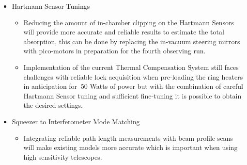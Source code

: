\begin{itemize}
\begin{itemize}
	\end{itemize}
	\item Hartmann Sensor Tunings
	\begin{itemize}
		\item Reducing the amount of in-chamber clipping on the Hartmann Sensors will provide more accurate and reliable results to estimate the total absorption, this can be done by replacing the in-vacuum steering mirrors with pico-motors in preparation for the fourth observing run.
		\item Implementation of the current Thermal Compensation System still faces challenges with reliable lock acquisition when pre-loading the ring heaters in anticipation for $\>50$ Watts of power but with the combination of careful Hartmann Sensor tuning and sufficient fine-tuning it is possible to obtain the desired settings.
	\end{itemize}
	\item Squeezer to Interferometer Mode Matching
	\begin{itemize}
		\item Integrating reliable path length measurements with beam profile scans will make existing models more accurate which is important when using high sensitivity telescopes.
	\end{itemize}
\end{itemize}

